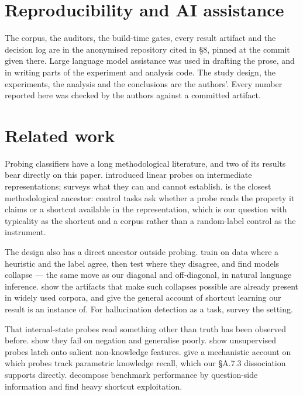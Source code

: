 \documentclass[10pt]{article}
\begin{document}
\section{Reproducibility and AI assistance}

The corpus, the auditors, the build-time gates, every result artifact and the decision log are in the anonymised repository cited in §8, pinned at the commit given there. Large language model assistance was used in drafting the prose, and in writing parts of the experiment and analysis code. The study design, the experiments, the analysis and the conclusions are the authors'. Every number reported here was checked by the authors against a committed artifact.

\section{Related work}

Probing classifiers have a long methodological literature, and two of its results bear directly on this paper. \citet{alain2017probes} introduced linear probes on intermediate representations; \citet{belinkov2022probing} surveys what they can and cannot establish. \citet{hewitt2019control} is the closest methodological ancestor: control tasks ask whether a probe reads the property it claims or a shortcut available in the representation, which is our question with typicality as the shortcut and a corpus rather than a random-label control as the instrument.

The design also has a direct ancestor outside probing. \citet{mccoy2019hans} train on data where a heuristic and the label agree, then test where they disagree, and find models collapse --- the same move as our diagonal and off-diagonal, in natural language inference. \citet{gururangan2018artifacts} show the artifacts that make such collapses possible are already present in widely used corpora, and \citep{geirhos2020shortcut} give the general account of shortcut learning our result is an instance of. For hallucination detection as a task, \citep{ji2023hallucination} survey the setting.

That internal-state probes read something other than truth has been observed before. \citet{levinstein2023still} show they fail on negation and generalise poorly. \citet{farquhar2023challenges} show unsupervised probes latch onto salient non-knowledge features. \citet{cheang2026really} give a mechanistic account on which probes track parametric knowledge recall, which our §A.7.3 dissociation supports directly. \citet{seo2026quantifying} decompose benchmark performance by question-side information and find heavy shortcut exploitation.
\end{document}
